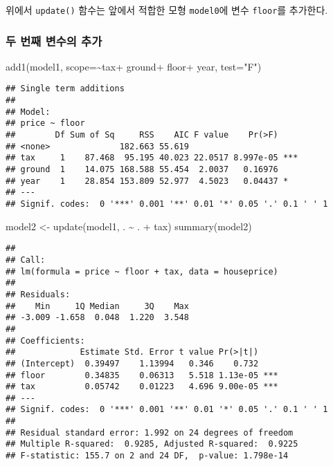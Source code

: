 \documentclass[
]{book}
\newenvironment{Shaded}{\begin{snugshade}}{\end{snugshade}}
\newcommand{\AttributeTok}[1]{\textcolor[rgb]{0.77,0.63,0.00}{#1}}
\newcommand{\FunctionTok}[1]{\textcolor[rgb]{0.00,0.00,0.00}{#1}}
\newcommand{\NormalTok}[1]{#1}
\newcommand{\OtherTok}[1]{\textcolor[rgb]{0.56,0.35,0.01}{#1}}
\newcommand{\SpecialCharTok}[1]{\textcolor[rgb]{0.00,0.00,0.00}{#1}}
\newcommand{\StringTok}[1]{\textcolor[rgb]{0.31,0.60,0.02}{#1}}
\begin{document}
위에서 \texttt{update()} 함수는 앞에서 적합한 모형 \texttt{model0}에 변수 \texttt{floor}를 추가한다.

\hypertarget{uxb450-uxbc88uxc9f8-uxbcc0uxc218uxc758-uxcd94uxac00}{%
\subsubsection{두 번째 변수의 추가}\label{uxb450-uxbc88uxc9f8-uxbcc0uxc218uxc758-uxcd94uxac00}}

\begin{Shaded}
\begin{Highlighting}[]
\FunctionTok{add1}\NormalTok{(model1, }\AttributeTok{scope=}\SpecialCharTok{\textasciitilde{}}\NormalTok{tax}\SpecialCharTok{+}\NormalTok{ ground}\SpecialCharTok{+}\NormalTok{ floor}\SpecialCharTok{+}\NormalTok{ year, }\AttributeTok{test=}\StringTok{"F"}\NormalTok{)}
\end{Highlighting}
\end{Shaded}

\begin{verbatim}
## Single term additions
## 
## Model:
## price ~ floor
##        Df Sum of Sq     RSS    AIC F value    Pr(>F)    
## <none>              182.663 55.619                      
## tax     1    87.468  95.195 40.023 22.0517 8.997e-05 ***
## ground  1    14.075 168.588 55.454  2.0037   0.16976    
## year    1    28.854 153.809 52.977  4.5023   0.04437 *  
## ---
## Signif. codes:  0 '***' 0.001 '**' 0.01 '*' 0.05 '.' 0.1 ' ' 1
\end{verbatim}

\begin{Shaded}
\begin{Highlighting}[]
\NormalTok{model2 }\OtherTok{\textless{}{-}} \FunctionTok{update}\NormalTok{(model1, . }\SpecialCharTok{\textasciitilde{}}\NormalTok{ . }\SpecialCharTok{+}\NormalTok{ tax)}
\FunctionTok{summary}\NormalTok{(model2)}
\end{Highlighting}
\end{Shaded}

\begin{verbatim}
## 
## Call:
## lm(formula = price ~ floor + tax, data = houseprice)
## 
## Residuals:
##    Min     1Q Median     3Q    Max 
## -3.009 -1.658  0.048  1.220  3.548 
## 
## Coefficients:
##             Estimate Std. Error t value Pr(>|t|)    
## (Intercept)  0.39497    1.13994   0.346    0.732    
## floor        0.34835    0.06313   5.518 1.13e-05 ***
## tax          0.05742    0.01223   4.696 9.00e-05 ***
## ---
## Signif. codes:  0 '***' 0.001 '**' 0.01 '*' 0.05 '.' 0.1 ' ' 1
## 
## Residual standard error: 1.992 on 24 degrees of freedom
## Multiple R-squared:  0.9285, Adjusted R-squared:  0.9225 
## F-statistic: 155.7 on 2 and 24 DF,  p-value: 1.798e-14
\end{verbatim}
\end{document}
